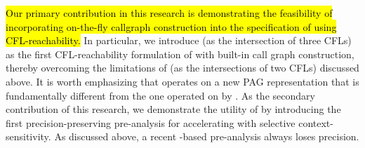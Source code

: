\begin{comment}
Naturally, one may attempt to exploit Melski-Reps reduction \cite{melski2000interconvertibility} to obtain the new CFL-reachability formulation from their corresponding inclusion-based formulation. Unfortunately, the new CFL-reachability formulation does not have an equivalent set-constraint formulation as its form would be an intersection of several CFLs which has been proven to be undecidable \cite{reps2000undecidability}.
\end{comment}

\hl{Our primary contribution in this research is demonstrating the feasibility of incorporating on-the-fly callgraph construction into the specification of  using CFL-reachability.} In particular,
we introduce \LFCR (as the intersection of three CFLs)
as the first %
CFL-reachability formulation of
 with built-in call graph construction, thereby overcoming the limitations of
\manuLFC (as the intersections of two CFLs) discussed above. It is worth emphasizing that
\LFCR operates on a new
PAG representation that is fundamentally different from the one operated on by \manuLFC. As the secondary contribution of this research, we demonstrate the utility of \LFCR
by introducing the first precision-preserving pre-analysis
for accelerating  with selective context-sensitivity. As discussed above, a recent \manuLFC-based
pre-analysis always loses precision.

\begin{comment}
We have designed \LFCR as the intersection of three CFLs to facilitate 
\LFCR-enabled CFL-reachability analyses. By noting that
\kcs{\infty} is undecidable and thus both the \manuLFC- and \LFCR-path
problems are undecidable (implying that either is a context-sensitive language
rather than a single CFL) \cite{reps2000undecidability}, 
\end{comment}

